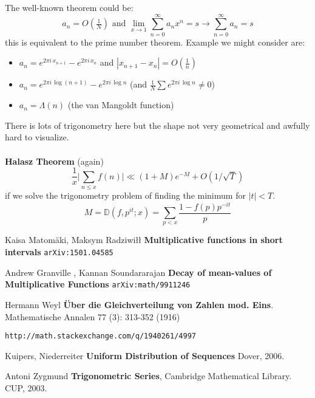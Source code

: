 \documentclass[12pt]{article}
\begin{document}
\noindent The well-known theorem could be:
$$ a_n = O( \tfrac{1}{N}) \text{ and }\lim_{x \to 1} \sum_{n=0}^\infty a_n x^n = s \longrightarrow \sum_{n=0}^\infty a_n = s $$
this is equivalent to the prime number theorem.  Example we might consider are:
\begin{itemize}
\item $a_n = e^{2\pi i \, x_{n+1}} - e^{2\pi i \, x_n } $ and $|x_{n+1}-x_n| = O(\tfrac{1}{n})$
\item $a_n = e^{2\pi i \, \log(n+1)} - e^{2\pi i \, \log n }  $ (and $\tfrac{1}{N} \sum e^{2\pi i \, \log n} \neq 0$)
\item $a_n = \Lambda(n)$ (the van Mangoldt function)
\end{itemize}
There is lots of trigonometry here but the shape not very geometrical and awfully hard to visualize.  \\ \\
\textbf{Halasz Theorem}  (again)
$$ \frac{1}{x}\big| \sum_{n \leq x} f(n) \big| \ll (1+M)e^{-M} + O(1/\sqrt{T})  $$ 
if we solve the trigonometry problem of finding the minimum for $|t| < T$.
 $$M = \mathbb{D}(f, p^{it}; x) = \sum_{p < x} \frac{1 - f(p) p^{-it}}{p} $$ 

\newpage

\selectfont \fontsize{12}{10}\selectfont


\begin{thebibliography}{}

\item Kaisa Matom\"{a}ki, Maksym Radziwi\l\l{} \textbf{Multiplicative functions in short intervals} \texttt{arXiv:1501.04585}

\item Andrew Granville , Kannan Soundararajan \textbf{Decay of mean-values of Multiplicative Functions} \texttt{arXiv:math/9911246}

\item Hermann Weyl \textbf{\"{U}ber die Gleichverteilung von Zahlen mod. Eins}. Mathematische Annalen 77 (3): 313-352 (1916)

\item \texttt{http://math.stackexchange.com/q/1940261/4997}

\item Kuipers, Niederreiter \textbf{Uniform Distribution of Sequences} Dover, 2006.

\item Antoni Zygmund \textbf{Trigonometric Series}, Cambridge Mathematical Library.  CUP, 2003.


\end{thebibliography}
\end{document}
